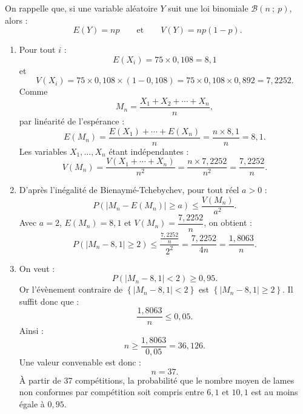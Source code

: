 \documentclass[10pt]{article}
\begin{document}
On rappelle que, si une variable aléatoire $Y$ suit une loi binomiale $\mathcal{B}(n~;~p)$, alors :
\[
E(Y)=np\qquad\text{et}\qquad V(Y)=np(1-p).
\]
\begin{enumerate}
	\item Pour tout $i$ :
	\[
	E(X_i)=75\times 0,108=8,1
	\]
	et
	\[
	V(X_i)=75\times 0,108\times (1-0,108)=75\times 0,108\times 0,892=7,2252.
	\]
	Comme
	\[
	M_n=\dfrac{X_1+X_2+\cdots+X_n}{n},
	\]
	par linéarité de l'espérance :
	\[
	E(M_n)=\dfrac{E(X_1)+\cdots+E(X_n)}{n}=\dfrac{n\times 8,1}{n}=8,1.
	\]
	Les variables $X_1,\ldots,X_n$ étant indépendantes :
	\[
	V(M_n)=\dfrac{V(X_1+\cdots+X_n)}{n^2}
	=\dfrac{n\times 7,2252}{n^2}
	=\dfrac{7,2252}{n}.
	\]

	\item D'après l'inégalité de Bienaymé-Tchebychev, pour tout réel $a>0$ :
	\[
	P\left(\left|M_n-E(M_n)\right|\geqslant a\right)\leqslant \dfrac{V(M_n)}{a^2}.
	\]
	Avec $a=2$, $E(M_n)=8,1$ et $V(M_n)=\dfrac{7,2252}{n}$, on obtient :
	\[
	P\left(\left|M_n-8,1\right|\geqslant 2\right)
	\leqslant \dfrac{\frac{7,2252}{n}}{2^2}
	=\dfrac{7,2252}{4n}
	=\dfrac{1,8063}{n}.
	\]

	\item On veut :
	\[
	P\left(\left|M_n-8,1\right|<2\right)\geqslant 0,95.
	\]
	Or l'évènement contraire de $\left\{\left|M_n-8,1\right|<2\right\}$ est
	$\left\{\left|M_n-8,1\right|\geqslant 2\right\}$.
	Il suffit donc que :
	\[
	\dfrac{1,8063}{n}\leqslant 0,05.
	\]
	Ainsi :
	\[
	n\geqslant \dfrac{1,8063}{0,05}=36,126.
	\]
	Une valeur convenable est donc :
	\[
	n=37.
	\]
	À partir de 37 compétitions, la probabilité que le nombre moyen de lames non conformes par compétition soit compris entre $6,1$ et $10,1$ est au moins égale à $0,95$.
\end{enumerate}
\end{document}
